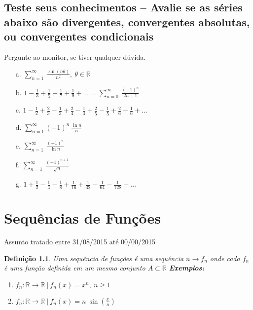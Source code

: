 \documentclass[12pt,openany]{book}
\newtheorem{definition}{Definição}[section]
\begin{document}
\section*{Teste seus conhecimentos -- Avalie se as séries abaixo são divergentes, convergentes absolutas, ou convergentes condicionais} Pergunte ao monitor, se tiver qualquer dúvida.
\begin{itemize}
\item [a.] $\displaystyle{\sum_{n=1}^{\infty} \ \frac{\sin(n\theta)}{n^2}, \ \theta \in \mathds{R}}$
\item [b.] $\displaystyle{1-\frac{1}{3}+\frac{1}{5}-\frac{1}{7}+ \frac{1}{9} + \hdots = \sum_{n=0}^{\infty} \ \frac{(-1)^n}{2n+1}}$
\item [c.] $\displaystyle{1-\frac{1}{2}+\frac{2}{3}-\frac{1}{3}+\frac{2}{4}-\frac{1}{4}+\frac{2}{5}-\frac{1}{5}+\frac{2}{6}}-\frac{1}{6}+ \hdots$
\item [d.] $\displaystyle{\sum_{n=1}^{\infty} (-1)^n \ \frac{\ln n}{n}}$
\item [e.] $\displaystyle{\sum_{n=1}^{\infty} \ \frac{(-1)^n}{\ln n}}$
\item [f.] $\displaystyle{\sum_{n=1}^{\infty} \ \frac{(-1)^{n+1}}{\sqrt{n}}}$
\item [g.] $\displaystyle{1+\frac{1}{2}-\frac{1}{4}-\frac{1}{8}+\frac{1}{16}+\frac{1}{32}-\frac{1}{64}-\frac{1}{128}+\hdots}$
\end{itemize}

\chapter{Sequências de Funções} Assunto tratado entre 31/08/2015 até 00/00/2015
\label{chap:c3}

\begin{definition} Uma sequência de funções é uma sequência $n \rightarrow f_n$ onde cada $f_n$ é uma função definida em um mesmo conjunto $A \subset \mathds{R}$ \textbf{Exemplos:} \begin{enumerate}
\item $f_n: \mathds{R} \rightarrow \mathds{R} \ | \ f_n(x) = x^n, \ n \geq 1$ \label{ex:302a}
\item $f_n: \mathds{R} \rightarrow \mathds{R} \ | \ f_n(x) = n\ \displaystyle{\sin \left( \frac{x}{n}\right)}$ \label{ex:302b}
\end{enumerate}
\end{definition}
\end{document}
